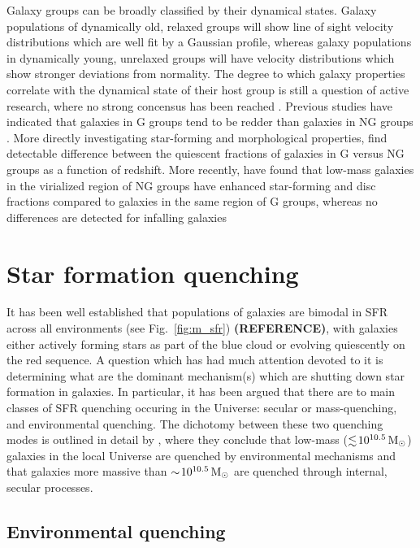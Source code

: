 Galaxy groups can be broadly classified by their dynamical states.
Galaxy populations of dynamically old, relaxed groups will show
line of sight velocity distributions which are well fit by a Gaussian
profile, whereas galaxy populations in dynamically young, unrelaxed
groups will have velocity distributions which show stronger deviations
from normality.  The degree to which galaxy properties correlate with
the dynamical state of their host group is still a question of active
research, where no strong concensus has been reached
\citep[e.g.][]{biviano2002, ribeiro2013b}.  Previous studies have
indicated that galaxies in G groups tend to be redder than galaxies in
NG groups \citep{ribeiro2010, carollo2013, ribeiro2013a}.  More
directly investigating star-forming and morphological properties,
\citet{hou2013} find detectable difference between the quiescent
fractions of galaxies in G versus NG groups as a function of
redshift.  More recently, \citet{roberts2016b} have found that
low-mass galaxies in the virialized region of NG groups have enhanced
star-forming and disc fractions compared to galaxies in the same
region of G groups, whereas no differences are detected for infalling
galaxies 

\section{Star formation quenching}
\label{sec:sfr_quench}

It has been well established that populations of galaxies are bimodal
in SFR across all environments (see Fig.~\ref{fig:m_sfr})
\textbf{(REFERENCE)}, with galaxies either actively forming stars as
part of the blue cloud or evolving quiescently on the red sequence.  A
question which has had much attention devoted to it is determining
what are the dominant mechanism(s) which are shutting down star
formation in galaxies.  In particular, it has been argued that there
are to main classes of SFR quenching occuring in the Universe: secular
or mass-quenching, and environmental quenching.  The dichotomy between
these two quenching modes is outlined in detail by \citet{peng2010},
where they conclude that low-mass ($\lesssim \! 10^{10.5}\,\mathrm{M_{\odot}}$)
galaxies in the local Universe are quenched by environmental
mechanisms and that galaxies more massive than $\sim \!
10^{10.5}\,\mathrm{M_{\odot}}$ are quenched through internal, secular processes.  

\subsection{Environmental quenching}
\label{sec:enviro_quench}

